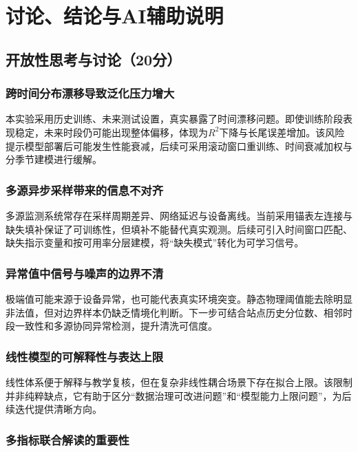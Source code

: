 ﻿\chapter{讨论、结论与AI辅助说明}

\section{开放性思考与讨论（20分）}

\subsection{跨时间分布漂移导致泛化压力增大}

本实验采用历史训练、未来测试设置，真实暴露了时间漂移问题。即使训练阶段表现稳定，未来时段仍可能出现整体偏移，体现为$R^2$下降与长尾误差增加。该风险提示模型部署后可能发生性能衰减，后续可采用滚动窗口重训练、时间衰减加权与分季节建模进行缓解。

\subsection{多源异步采样带来的信息不对齐}

多源监测系统常存在采样周期差异、网络延迟与设备离线。当前采用锚表左连接与缺失填补保证了可训练性，但填补不能替代真实观测。后续可引入时间窗口匹配、缺失指示变量和按可用率分层建模，将“缺失模式”转化为可学习信号。

\subsection{异常值中信号与噪声的边界不清}

极端值可能来源于设备异常，也可能代表真实环境突变。静态物理阈值能去除明显非法值，但对边界样本仍缺乏情境化判断。下一步可结合站点历史分位数、相邻时段一致性和多源协同异常检测，提升清洗可信度。

\subsection{线性模型的可解释性与表达上限}

线性体系便于解释与教学复核，但在复杂非线性耦合场景下存在拟合上限。该限制并非纯粹缺点，它有助于区分“数据治理可改进问题”和“模型能力上限问题”，为后续迭代提供清晰方向。

\subsection{多指标联合解读的重要性}

